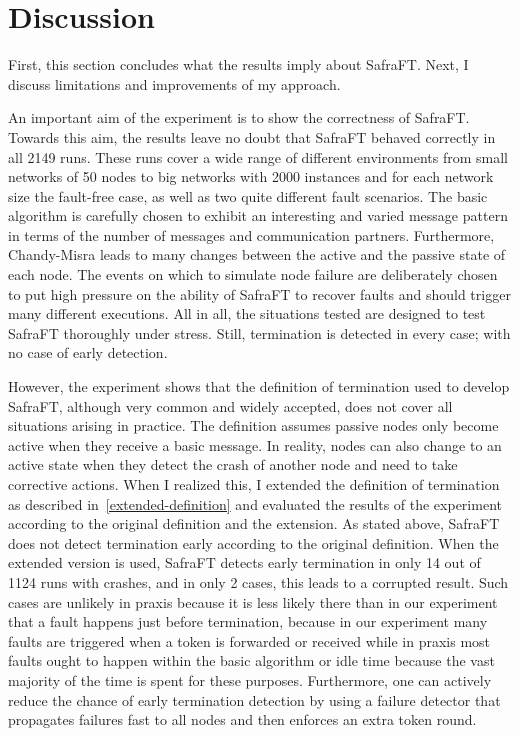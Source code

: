 \section{Discussion}
First, this section concludes what the results imply about SafraFT. Next, I discuss limitations and improvements of my approach.

An important aim of the experiment is to show the correctness of SafraFT.
Towards this aim, the results leave no doubt that SafraFT behaved correctly in all 2149 %
runs.
These runs cover a wide range of different environments from small networks of 50 nodes to big networks with 2000 instances and for each network size the fault-free case, as well as two quite different fault scenarios.
The basic algorithm is carefully chosen to exhibit an interesting and varied message pattern in terms of the number of messages and communication partners.
Furthermore, Chandy-Misra leads to many changes between the active and the passive state of each node.
The events on which to simulate node failure are deliberately chosen to put high pressure on the ability of SafraFT to recover faults and should trigger many different executions.
All in all, the situations tested are designed to test SafraFT thoroughly under stress.
Still, termination is detected in every case; with no case of early detection.

However, the experiment shows that the definition of termination used to develop SafraFT, although very common and widely accepted, does not cover all situations arising in practice.
The definition assumes passive nodes only become active when they receive a basic message.
In reality, nodes can also change to an active state when they detect the crash of another node and need to take corrective actions.
When I realized this, I extended the definition of termination as described in~\cref{extended-definition} and evaluated the results of the experiment according to the original definition and the extension.
As stated above, SafraFT does not detect termination early according to the original definition.
When the extended version is used, SafraFT detects early termination in only 14 out of 1124 runs with crashes, and in only 2 cases, this leads to a corrupted result. %
Such cases are unlikely in praxis because it is less likely there than in our experiment that a fault happens just before termination, because in our experiment many faults are triggered when a token is forwarded or received while in praxis most faults ought to happen within the basic algorithm or idle time because the vast majority of the time is spent for these purposes.
Furthermore, one can actively reduce the chance of early termination detection by using a failure detector that propagates failures fast to all nodes and then enforces an extra token round.


